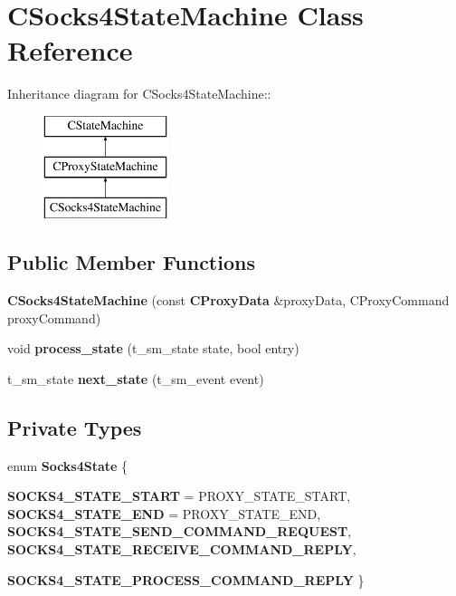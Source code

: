 \section{CSocks4StateMachine Class Reference}
\label{classCSocks4StateMachine}
Inheritance diagram for CSocks4StateMachine::\begin{figure}[H]
\begin{center}
\leavevmode
\includegraphics[height=3cm]{classCSocks4StateMachine}
\end{center}
\end{figure}
\subsection*{Public Member Functions}
\begin{DoxyCompactItemize}
\item 
{\bfseries CSocks4StateMachine} (const {\bf CProxyData} \&proxyData, CProxyCommand proxyCommand)\label{classCSocks4StateMachine_a63d23f4716764a647cee4fbf258c47a7}

\item 
void {\bfseries process\_\-state} (t\_\-sm\_\-state state, bool entry)\label{classCSocks4StateMachine_a1cf6dbd1b18d6504ba495c78b0551ae6}

\item 
t\_\-sm\_\-state {\bfseries next\_\-state} (t\_\-sm\_\-event event)\label{classCSocks4StateMachine_a47de4d5179389cab5c06fdb0a8926037}

\end{DoxyCompactItemize}
\subsection*{Private Types}
\begin{DoxyCompactItemize}
\item 
enum {\bfseries Socks4State} \{ \par
{\bfseries SOCKS4\_\-STATE\_\-START} =  PROXY\_\-STATE\_\-START, 
{\bfseries SOCKS4\_\-STATE\_\-END} =  PROXY\_\-STATE\_\-END, 
{\bfseries SOCKS4\_\-STATE\_\-SEND\_\-COMMAND\_\-REQUEST}, 
{\bfseries SOCKS4\_\-STATE\_\-RECEIVE\_\-COMMAND\_\-REPLY}, 
\par
{\bfseries SOCKS4\_\-STATE\_\-PROCESS\_\-COMMAND\_\-REPLY}
 \}
\end{DoxyCompactItemize}
